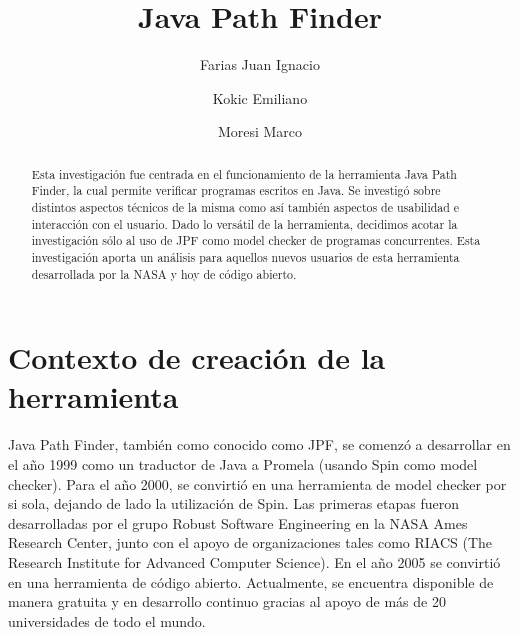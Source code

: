 \documentclass[runningheads]{llncs}
\begin{document}
%
\title{\textbf{Java Path Finder}
}
%
%
\author{Farias Juan Ignacio\and
Kokic Emiliano\and
Moresi Marco}
%
%
%
\maketitle              %
%
\begin{abstract}
Esta investigación fue centrada en el funcionamiento de la herramienta Java Path Finder, la cual permite verificar programas escritos en Java. Se investigó sobre distintos aspectos técnicos de la misma como así también aspectos de usabilidad e interacción con el usuario.
Dado lo versátil de la herramienta, decidimos acotar la investigación sólo al uso de JPF como model checker de programas concurrentes. Esta investigación aporta un análisis para aquellos nuevos usuarios de esta herramienta desarrollada por la NASA y hoy de código abierto.


\end{abstract}
%
%
%
\section{Contexto de creación de la herramienta}

Java Path Finder, también como conocido como JPF,  se comenzó a desarrollar en el año  1999 como un traductor de Java a Promela (usando Spin como model checker). Para el año 2000, se convirtió en una herramienta de model checker por si sola, dejando de lado la utilización de Spin. Las primeras etapas fueron desarrolladas por el grupo Robust Software Engineering en la NASA Ames Research Center, junto con el apoyo de organizaciones tales como RIACS (The Research Institute for Advanced Computer Science).
En el año 2005 se convirtió en una herramienta de código abierto. Actualmente, se encuentra disponible de manera gratuita y en desarrollo continuo gracias al apoyo de más de 20 universidades de todo el mundo.
\end{document}
